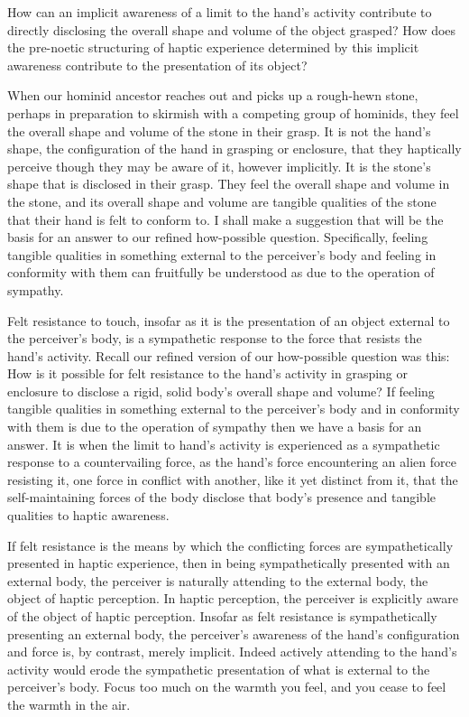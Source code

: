 How can an implicit awareness of a limit to the hand's activity contribute to directly disclosing the overall shape and volume of the object grasped? How does the pre-noetic structuring of haptic experience determined by this implicit awareness contribute to the presentation of its object? 

When our hominid ancestor reaches out and picks up a rough-hewn stone, perhaps in preparation to skirmish with a competing group of hominids, they feel the overall shape and volume of the stone in their grasp. It is not the hand's shape, the configuration of the hand in grasping or enclosure, that they haptically perceive though they may be aware of it, however implicitly. It is the stone's shape that is disclosed in their grasp. They feel the overall shape and volume in the stone, and its overall shape and volume are tangible qualities of the stone that their hand is felt to conform to. I shall make a suggestion that will be the basis for an answer to our refined how-possible question. Specifically, feeling tangible qualities in something external to the perceiver's body and feeling in conformity with them can fruitfully be understood as due to the operation of sympathy. 

Felt resistance to touch, insofar as it is the presentation of an object external to the perceiver's body, is a sympathetic response to the force that resists the hand's activity. Recall our refined version of our how-possible question was this: How is it possible for felt resistance to the hand's activity in grasping or enclosure to disclose a rigid, solid body's overall shape and volume? If feeling tangible qualities in something external to the perceiver's body and in conformity with them is due to the operation of sympathy then we have a basis for an answer. It is when the limit to hand's activity is experienced as a sympathetic response to a countervailing force, as the hand's force encountering an alien force resisting it, one force in conflict with another, like it yet distinct from it, that the self-maintaining forces of the body disclose that body's presence and tangible qualities to haptic awareness.

If felt resistance is the means by which the conflicting forces are sympathetically presented in haptic experience, then in being sympathetically presented with an external body, the perceiver is naturally attending to the external body, the object of haptic perception. In haptic perception, the perceiver is explicitly aware of the object of haptic perception. Insofar as felt resistance is sympathetically presenting an external body, the perceiver's awareness of the hand's configuration and force is, by contrast, merely implicit. Indeed actively attending to the hand's activity would erode the sympathetic presentation of what is external to the perceiver's body. Focus too much on the warmth you feel, and you cease to feel the warmth in the air. 

